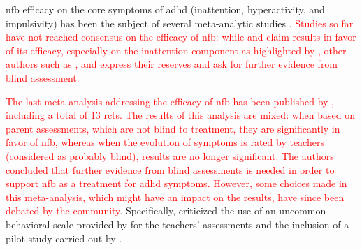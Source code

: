 \gls{nfb} efficacy on the core symptoms of \gls{adhd} (inattention, hyperactivity, and impulsivity) has been the 
subject of several meta-analytic studies \citep{Loo2005, Lofthouse2012, Arns2009, Micoulaud2014, Sonuga-Barke2013}. 
\textcolor{red}{Studies  so far have not reached consensus on the efficacy of \gls{nfb}: while \citet{Arns2009} and \citet{Micoulaud2014} 
claim results in favor of its efficacy, especially on the inattention component as highlighted by \citeauthor{Micoulaud2014}, other authors such as
\citet{Loo2005, Lofthouse2012}, and \citet{Sonuga-Barke2013} express their reserves and ask for further evidence from blind assessment.}

\textcolor{red}{The last meta-analysis addressing the efficacy of \gls{nfb} has been published by \citet{Cortese2016}, including a total of 13
\glspl{rct}. The results of this analysis are mixed: when based on parent assessments, which are not blind to treatment, they are significantly 
in favor of \gls{nfb}, whereas when the evolution of symptoms is rated by teachers (considered as probably blind), results are no longer 
significant. The authors concluded that further evidence from blind assessments is needed in order to support \gls{nfb} as a treatment for \gls{adhd} symptoms.
However, some choices made in this meta-analysis, which might have an impact on the results, have since been debated by the community}. Specifically, 
\citet{Micoulaud2016} criticized the use of an uncommon behavioral scale provided by \citet{Steiner2014} for the teachers' assessments 
and the inclusion of a pilot study carried out by \citet{Arnold2014}. 

